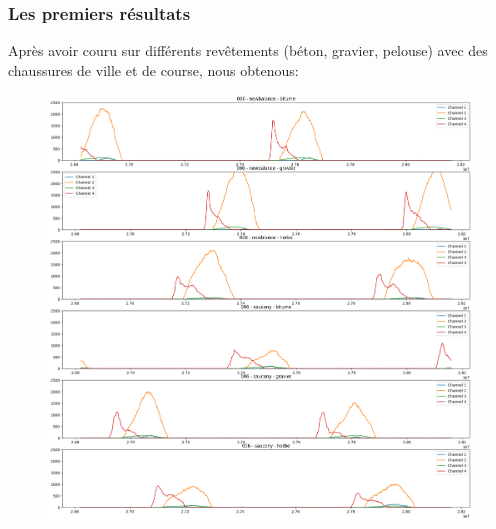 \begin{frame}
    \frametitle{Les premiers résultats}
    Après avoir couru sur différents revêtements (béton, gravier, pelouse) avec des chaussures de ville et de course, nous obtenous:
    \begin{figure}
        \includegraphics[scale=0.17]{./figures/res_01.png}
        \centering
    \end{figure}
\end{frame}
